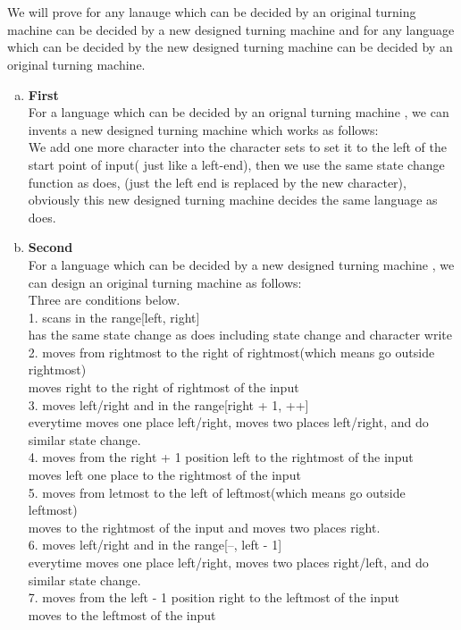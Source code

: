 \documentclass[11pt]{article}
\begin{document}
\part{}
    We will prove for any lanauge which can be decided by an original turning machine can be decided by a new designed turning machine
    and for any language which can be decided by the new designed turning machine can be decided by an original turning machine.
\begin{enumerate}[a)]
\item {\bf First} \\
    For a language which can be decided by an orignal turning machine \mf{}, we can invents a new designed turning machine \ms{} which works as follows: \\
    We add one more character into the character sets to set it to the left of the start point of input( just like a left-end),
    then we use the same state change function as \mf{} does, (just the left end is replaced by the new character), obviously this new designed turning machine \ms{} decides
    the same language as \mf{} does.
\item {\bf Second} \\
    For a language which can be decided by a new designed turning machine \mf{}, we can design an original turning machine \ms{} as follows:  \\
    Three are conditions below. \\ 
    1.\mf{} scans in the range[left, right] \\ 
        \ms{} has the same state change as \mf{} does including state change and character write \\
    2.\mf{} moves from rightmost to the right of rightmost(which means go outside rightmost) \\
        \ms{} moves right to the right of rightmost of the input \\
    3.\mf{} moves left/right and in the range[right + 1, ++] \\
        everytime \mf{} moves one place left/right, \ms{} moves two places left/right, and do similar state change. \\ 
    4.\mf{} moves from the right + 1 position  left to the rightmost of the input \\
        \ms{} moves left one place to the rightmost of the input \\ 
    5.\mf{} moves from letmost to the left of leftmost(which means go outside leftmost) \\
        \ms{} moves to the rightmost of the input and moves two places right. \\
    6.\mf{} moves left/right and in the range[--, left - 1] \\
        everytime \mf{} moves one place left/right, \ms{} moves two places right/left, and do similar state change. \\ 
    7.\mf{} moves from the left - 1 position right to the leftmost of the input \\
        \ms{} moves to the leftmost of the input \\


\end{enumerate}
\end{document}
